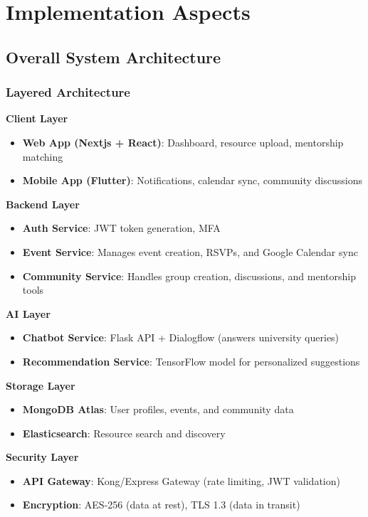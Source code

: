 \chapter{Implementation Aspects}
\label{chap:implementation}

\section{Overall System Architecture}
\label{sec:system_architecture}

\subsection{Layered Architecture}

\textbf{Client Layer}
\begin{itemize}
    \item \textbf{Web App (Nextjs + React)}: Dashboard, resource upload, mentorship matching
    \item \textbf{Mobile App (Flutter)}: Notifications, calendar sync, community discussions
\end{itemize}

\textbf{Backend Layer}
\begin{itemize}
    \item \textbf{Auth Service}: JWT token generation, MFA
    \item \textbf{Event Service}: Manages event creation, RSVPs, and Google Calendar sync
    \item \textbf{Community Service}: Handles group creation, discussions, and mentorship tools
\end{itemize}

\textbf{AI Layer}
\begin{itemize}
    \item \textbf{Chatbot Service}: Flask API + Dialogflow (answers university queries)
    \item \textbf{Recommendation Service}: TensorFlow model for personalized suggestions
\end{itemize}

\textbf{Storage Layer}
\begin{itemize}
    \item \textbf{MongoDB Atlas}: User profiles, events, and community data
    \item \textbf{Elasticsearch}: Resource search and discovery
\end{itemize}

\textbf{Security Layer}
\begin{itemize}
    \item \textbf{API Gateway}: Kong/Express Gateway (rate limiting, JWT validation)
    \item \textbf{Encryption}: AES-256 (data at rest), TLS 1.3 (data in transit)
\end{itemize}

